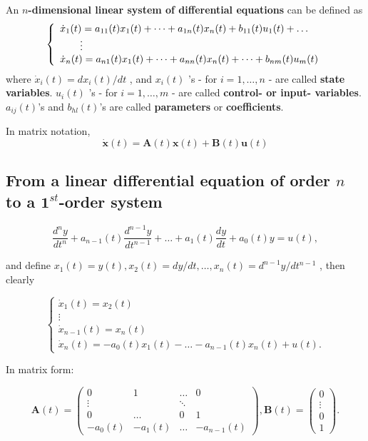 \begin{definition}
    An \textbf{\(n\)-dimensional linear system of differential
        equations} can be defined as
    \[
        \left\{ \begin{array}{l l}{\dot{x}_{1}(t) = a_{11}(t)x_{1}(t) + \dots +a_{1n}(t)x_{n}(t) + b_{11}(t)u_{1}(t) + \dots}\\ {\qquad \vdots}\\ {\dot{x}_{n}(t) = a_{n1}(t)x_{1}(t) + \dots +a_{n n}(t)x_{n}(t) + \dots +b_{n m}(t)u_{m}(t)} \end{array} \right.
    \]
    where \(\dot{x}_i(t) = dx_i(t) / dt\) , and \(x_i(t)\) 's - for \(i = 1, \ldots , n\) - are called \textbf{state variables}. \(u_i(t)\) 's - for \(i = 1, \ldots , m\) - are called \textbf{control- or input- variables}. \(a_{ij}(t)\)'s and \(b_{hl}(t)\)'s are called \textbf{parameters} or \textbf{coefficients}.

    In matrix notation,
    \[
        \dot{\mathbf{x}} (t) = \mathbf{A}(t)\mathbf{x}(t) + \mathbf{B}(t)\mathbf{u}(t) \tag{1}
    \]
\end{definition}


\subsection{From a linear differential equation of order \(n\) to a \(\mathbf{1}^{st}\)-order system}

\[
    \frac{d^{n}y}{dt^{n}} +a_{n - 1}(t)\frac{d^{n - 1}y}{dt^{n - 1}} +\dots +a_{1}(t)\frac{dy}{dt} +a_{0}(t)y = u(t),
\]

and define
\(x_{1}(t) = y(t), x_{2}(t) = dy / dt, \ldots , x_{n}(t) = d^{n - 1}y / dt^{n - 1}\)
, then clearly

\[
    \left\{ \begin{array}{c}\dot{x}_1(t) = x_2(t)\\ \vdots \\ \dot{x}_{n - 1}(t) = x_n(t)\\ \dot{x}_n(t) = -a_0(t)x_1(t) - \dots -a_{n - 1}(t)x_n(t) + u(t). \end{array} \right.
\]

In matrix form:

\[
    \mathbf{A}(t) = \left( \begin{array}{cccc}0 & 1 & \dots & 0\\ \vdots & & \ddots & \\ 0 & \dots & 0 & 1\\ -a_0(t) & -a_1(t) & \dots & -a_{n - 1}(t) \end{array} \right), \mathbf{B}(t) = \left( \begin{array}{c}0\\ \vdots \\ 0\\ 1 \end{array} \right).
\]


